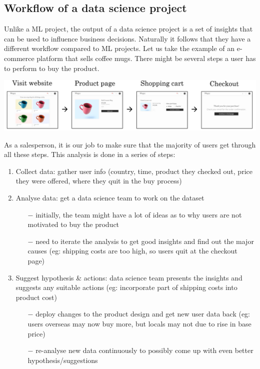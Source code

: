 \documentclass{article}[a4paper,12pt]
\theoremstyle{definition}
\begin{document}
\subsection{Workflow of a data science project}
Unlike a ML project, the output of a data science project is a set of insights that can be used to influence business decisions. Naturally it follows that they have a different workflow compared to ML projects. Let us take the example of an e-commerce platform that sells coffee mugs. There might be several steps a user has to perform to buy the product.
\begin{center}
\includegraphics[width=\textwidth]{ecommerce_steps.png}
\end{center}
As a salesperson, it is our job to make sure that the majority of users get through all these steps. This analysis is done in a series of steps:
\begin{enumerate}
	\item Collect data: gather user info (country, time, product they checked out, price they were offered, where they quit in the buy process)
	\item Analyse data: get a data science team to work on the dataset
	\begin{itemize}
		\item[$-$] initially, the team might have a lot of ideas as to why users are not motivated to buy the product
		\item[$-$] need to iterate the analysis to get good insights and find out the major causes (eg: shipping costs are too high, so users quit at the checkout page)
	\end{itemize}
	\item Suggest hypothesis \& actions: data science team presents the insights and suggests any suitable actions (eg: incorporate part of shipping costs into product cost)
	\begin{itemize}
		\item[$-$] deploy changes to the product design and get new user data back (eg: users overseas may now buy more, but locals may not due to rise in base price)
		\item[$-$] re-analyse new data continuously to possibly come up with even better hypothesis/suggestions
	\end{itemize}
\end{enumerate}
\end{document}
